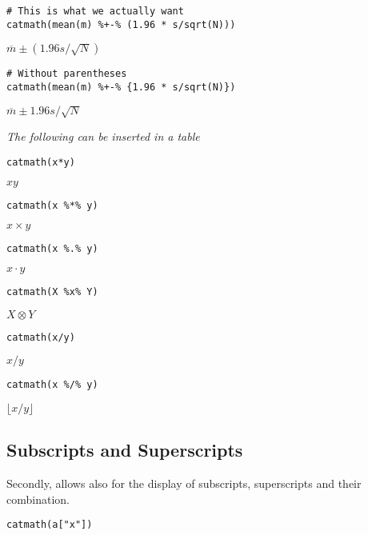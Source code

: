 \begin{verbatim}
# This is what we actually want
catmath(mean(m) %+-% (1.96 * s/sqrt(N)))
\end{verbatim}

\({\overline{{m}}\pm\left({{{1.96}{}{s}}/\sqrt{{N}}}\right)}\)

\begin{verbatim}
# Without parentheses
catmath(mean(m) %+-% {1.96 * s/sqrt(N)})
\end{verbatim}

\({\overline{{m}}\pm{{{1.96}{}{s}}/\sqrt{{N}}}}\)

\emph{The following can be inserted in a table}

\begin{verbatim}
catmath(x*y)
\end{verbatim}

\({{x}{}{y}}\)

\begin{verbatim}
catmath(x %*% y)
\end{verbatim}

\({{x}\times{y}}\)

\begin{verbatim}
catmath(x %.% y)
\end{verbatim}

\({{x}\cdot{y}}\)

\begin{verbatim}
catmath(X %x% Y)
\end{verbatim}

\({{X}\otimes{Y}}\)

\begin{verbatim}
catmath(x/y)
\end{verbatim}

\({{x}/{y}}\)

\begin{verbatim}
catmath(x %/% y)
\end{verbatim}

\({\lfloor{{x}/{y}}\rfloor}\)

\hypertarget{subscripts-and-superscripts}{%
\subsection{Subscripts and Superscripts}\label{subscripts-and-superscripts}}

Secondly,  allows also for the display of subscripts, superscripts and their combination.

\begin{verbatim}
catmath(a["x"])
\end{verbatim}

